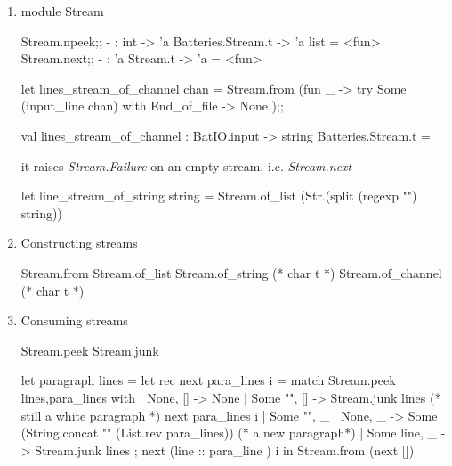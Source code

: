 \begin{enumerate}
\begin{ocamlcode}
   \end{ocamlcode}
   

\item module Stream


\begin{alternate}
Stream.npeek;;
- : int -> 'a Batteries.Stream.t -> 'a list = <fun>
Stream.next;;
- : 'a Stream.t -> 'a = <fun>
\end{alternate}



\begin{ocamlcode}
let lines_stream_of_channel chan = Stream.from (fun _ -> 
    try Some (input_line chan) with End_of_file -> None );;
\end{ocamlcode}

\begin{ocamlcode}  
val lines_stream_of_channel : BatIO.input -> string Batteries.Stream.t =
\end{ocamlcode}


it raises \textit{Stream.Failure} on an empty stream,
i.e. \textit{Stream.next}

\begin{ocamlcode}
let line_stream_of_string string =
  Stream.of_list (Str.(split (regexp "\n") string))
\end{ocamlcode}

\item Constructing streams \\
  \begin{bluetext}
    Stream.from
    Stream.of_list
    Stream.of_string (* char t *)
    Stream.of_channel (* char t *)
  \end{bluetext}

\item Consuming streams \\

\begin{bluetext}
   Stream.peek
   Stream.junk
\end{bluetext}

\begin{ocamlcode}
let paragraph lines =
  let rec next para_lines i =
    match Stream.peek lines,para_lines with
    | None, [] -> None
    | Some "", [] ->
      Stream.junk lines (* still a white paragraph *)
      next para_lines i
    | Some "", _ | None, _ ->
      Some (String.concat "\n" (List.rev para_lines)) (* a new paragraph*)
    | Some line, _ ->
      Stream.junk lines ;
      next (line :: para_line ) i in
  Stream.from (next [])    
\end{ocamlcode}


\end{enumerate}
